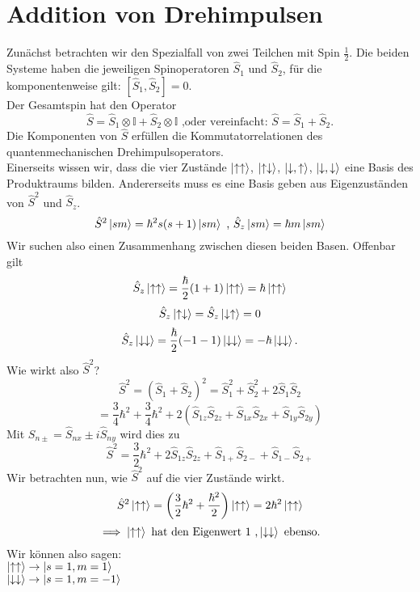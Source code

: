 \documentclass{report}
\begin{document}
\section{Addition von Drehimpulsen}
Zunächst betrachten wir den Spezialfall von zwei Teilchen mit Spin $\frac{1}{2}$. Die beiden Systeme haben die jeweiligen Spinoperatoren $\hat{S}_1$ und $\hat{S}_2$, für die komponentenweise gilt: $[\hat{S}_1, \hat{S}_2] = 0$. \\
Der Gesamtspin hat den Operator \[
	\hat{S} = \hat{S}_1 \otimes \mathbb{I} + \hat{S}_2 \otimes \mathbb{I} \text{ ,oder vereinfacht: } \hat{S} = \hat{S}_1 + \hat{S}_2 
.\] Die Komponenten von $\hat{S}$ erfüllen die Kommutatorrelationen des quantenmechanischen Drehimpulsoperators.\\
Einerseits wissen wir, dass die vier Zustände $\ket{\uparrow \uparrow} $, $\ket{\uparrow \downarrow} $, $\ket{\downarrow, \uparrow} $, $\ket{\downarrow, \downarrow} $ eine Basis des Produktraums bilden. Andererseits muss es eine Basis geben aus Eigenzuständen von $\hat{S}^2$ und $\hat{S}_z$. \[
	\hat{S}^2 \ket{sm} = \hbar^2 s(s+1) \ket{sm} \text{ , } \hat{S}_z \ket{sm} = \hbar m \ket{sm} 
\] Wir suchen also einen Zusammenhang zwischen diesen beiden Basen. Offenbar gilt \[
\hat{S}_z \ket{\uparrow \uparrow} = \frac{\hbar}{2} (1 + 1) \ket{\uparrow \uparrow} = \hbar \ket{\uparrow \uparrow} 
\] \[
\hat{S}_z \ket{\uparrow \downarrow} = \hat{S}_z \ket{\downarrow \uparrow} = 0
\] \[
\hat{S}_z \ket{\downarrow \downarrow} = \frac{\hbar}{2} (-1 -1) \ket{\downarrow \downarrow} = -\hbar \ket{\downarrow \downarrow} 
.\] Wie wirkt also $\hat{S}^2$? \[
\hat{S}^2 = \left( \hat{S}_1 + \hat{S}_2 \right) ^2 = \hat{S}_1^2 + \hat{S}_2^2 + 2\hat{S}_1\hat{S}_2
\] \[
= \frac{3}{4} \hbar^2 + \frac{3}{4} \hbar^2 + 2\left( \hat{S}_{1z}\hat{S}_{2z} + \hat{S}_{1x}\hat{S}_{2x} + \hat{S}_{1y}\hat{S}_{2y} \right) 
\] Mit $S_{n\pm} = \hat{S}_{nx} \pm i \hat{S}_{ny}$ wird dies zu \[
\hat{S}^2 = \frac{3}{2} \hbar^2 + 2 \hat{S}_{1z}\hat{S}_{2z} + \hat{S}_{1+}\hat{S}_{2-} + \hat{S}_{1-}\hat{S}_{2+}
\] Wir betrachten nun, wie $\hat{S}^2$ auf die vier Zustände wirkt. \[
\hat{S}^2 \ket{\uparrow \uparrow} = \left( \frac{3}{2} \hbar^2 + \frac{\hbar^2}{2} \right) \ket{\uparrow \uparrow} = 2\hbar^2 \ket{\uparrow \uparrow} 
\] \[
\implies \ket{\uparrow \uparrow} \text{ hat den Eigenwert } 1  \text{ ,} \ket{\downarrow \downarrow} \text{ ebenso.}
\] Wir können also sagen: \\
$\ket{\uparrow \uparrow} \to \ket{s = 1, m = 1} $ \\
$\ket{\downarrow \downarrow}  \to  \ket{s=1, m = -1} $ \\
\end{document}
